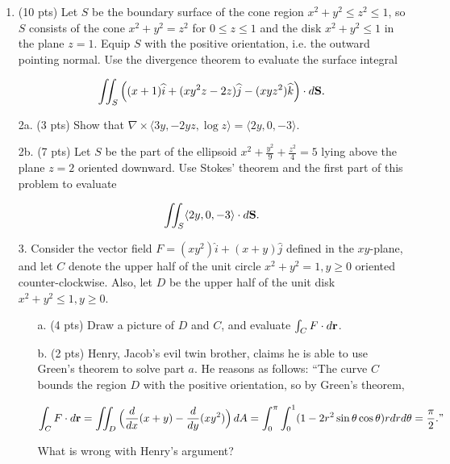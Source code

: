 \documentclass[12 pt]{report}
\begin{document}
\newpage
\begin{enumerate}

\item (10 pts) Let $S$ be the boundary surface of the cone region $x^2+y^2 \leq z^2 \leq 1$, so $S$ consists of the cone $x^2+y^2 = z^2$ for $0 \leq z \leq 1$ and the disk $x^2+y^2 \leq 1$ in the plane $z=1$. Equip $S$ with the positive orientation, i.e. the outward pointing normal. Use the divergence theorem to evaluate the surface integral

$$\iint_S \Big((x + 1)\widehat{i} +  (xy^2z - 2z)\widehat{j} - (xyz^2)\widehat{k}\Big)\cdot d \bold{S}.$$
\newpage

\item[2a.] (3 pts) Show that $\nabla \times \langle 3y, -2yz, \log z \rangle = \langle 2y, 0, -3 \rangle$.

\vspace{5cm} 

\item[2b.] (7 pts) Let $S$ be the part of the ellipsoid $x^2+\frac{y^2}{9}+\frac{z^2}{4} = 5$ lying above the plane $z = 2$ oriented downward. Use Stokes' theorem and the first part of this problem to evaluate 

$$\iint_S \langle 2y, 0, -3 \rangle \cdot d\bold{S}.$$
 
\newpage

\item[3.] Consider the vector field $F = (xy^2)\widehat{i} + (x+y)\widehat{j}$ defined in the $xy$-plane, and let $C$ denote the upper half of the unit circle $x^2+y^2 = 1, y \geq 0$ oriented counter-clockwise. Also, let $D$ be the upper half of the unit disk $x^2 + y^2 \leq 1, y \geq 0$. 
\begin{enumerate}
\item[a.] (4 pts) Draw a picture of $D$ and $C$, and evaluate $\int_C F \cdot d\bold{r}$. 

\vspace{7cm}

\item[b.] (2 pts) Henry, Jacob's evil twin brother, claims he is able to use Green's theorem to solve part $a$. He reasons as follows: ``The curve $C$ bounds the region $D$ with the positive orientation, so by Green's theorem, 

$$\int_C F \cdot d\bold{r} = \iint_D \Big(\frac{d}{dx}(x+y) - \frac{d}{dy}(xy^2) \Big) \, dA = \int_0^\pi \int_0^1 (1-2r^2 \sin\theta \cos\theta) r dr d\theta = \frac{\pi}{2}."$$

What is wrong with Henry's argument?   


\end{enumerate}
\end{enumerate}
\end{document}
